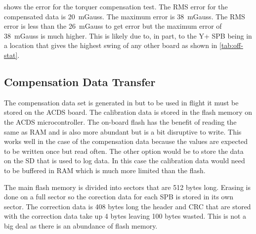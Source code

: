 
 shows the error for the torquer compensation test. The RMS error for the compensated data is 20~mGauss. The maximum error is 38~mGauss. The RMS error is less than the 26~mGauss to get {\textdegree} error but the maximum error of 38~mGauss is much higher. This is likely due to, in part, to the Y+ \ac{SPB} being in a location that gives the highest swing of any other board as shown in \cref{tab:off-stat}.


\subsection{Compensation Data Transfer}

The compensation data set is generated in \matlab but to be used in flight it must be stored on the \ac{ACDS} board. The calibration data is stored in the flash memory on the \ac{ACDS} microcontroller. The on-board flash has the benefit of reading the same as \ac{RAM} and is also more abundant but is a bit disruptive to write. This works well in the case of the compensation data because the values are expected to be written once but read often. The other option would be to store the data on the \ac{SD} that is used to log data. In this case the calibration data would need to be buffered in \ac{RAM} which is much more limited than the flash. 

The main flash memory is divided into sectors that are 512 bytes long. Erasing is done on a full sector so the corection data for each \ac{SPB} is stored in its own sector. The correction data is 408 bytes long the header and \ac{CRC} that are stored with the correction data take up 4 bytes leaving 100 bytes wasted. This is not a big deal as there is an abundance of flash memory.


